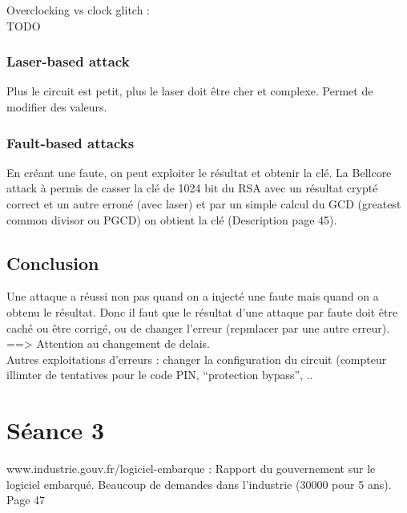 \documentclass[a4paper,12pt]{article}
\begin{document}
\large Overclocking vs clock glitch : \normalsize \\
TODO\\

\subsubsection{Laser-based attack}
Plus le circuit est petit, plus le laser doit être cher et complexe. Permet de modifier des valeurs.

\subsubsection{Fault-based attacks}
En créant une faute, on peut exploiter le résultat et obtenir la clé. 
La Bellcore attack à permis de casser la clé de 1024 bit du RSA avec un résultat crypté correct et un autre erroné (avec laser) et par un simple calcul du GCD (greatest common divisor ou PGCD) on obtient la clé (Description page 45).


\subsection{Conclusion}
Une attaque a réussi non pas quand on a injecté une faute mais quand on a obtenu le résultat. Donc il faut que le résultat d'une attaque par faute doit être caché ou être corrigé, ou de changer l'erreur (repmlacer par une autre erreur). \\
==> Attention au changement de delais.\\
Autres exploitations d'erreurs : changer la configuration du circuit (compteur illimter de tentatives pour le code PIN, ``protection bypass'', ..



\section{Séance 3}

www.industrie.gouv.fr/logiciel-embarque : Rapport du gouvernement sur le logiciel embarqué.
Beaucoup de demandes dans l'industrie (30000 pour 5 ans).\\

Page 47\\
\end{document}
